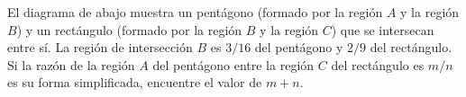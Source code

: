 El diagrama de abajo muestra un pentágono (formado por la región $A$ y la región $B$) y un rectángulo (formado por la región $B$ y la región $C$) que se intersecan entre sí. La región de intersección $B$ es $3/16$ del pentágono y $2/9$ del rectángulo. Si la razón de la región $A$ del pentágono entre la región $C$ del rectángulo es $m/n$ es su forma simplificada, encuentre el valor de $m + n$.